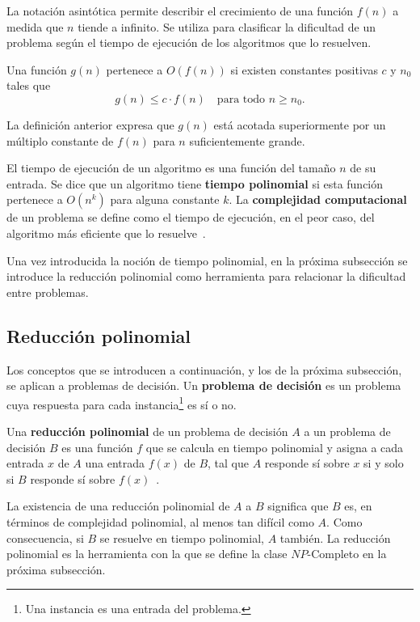 La notación asintótica permite describir el crecimiento de una función
$f(n)$ a medida que $n$ tiende a infinito. Se utiliza para clasificar
la dificultad de un problema según el tiempo de ejecución de los
algoritmos que lo resuelven.

\begin{definicion}
Una función $g(n)$ pertenece a $O(f(n))$ si existen constantes positivas
$c$ y $n_0$ tales que
\[
  g(n) \le c \cdot f(n) \quad \text{para todo } n \ge n_0.
\]
\end{definicion}

La definición anterior expresa que $g(n)$ está acotada superiormente
por un múltiplo constante de $f(n)$ para $n$ suficientemente grande.

El tiempo de ejecución de un algoritmo es una función del tamaño $n$
de su entrada. Se dice que un algoritmo tiene \textbf{tiempo
polinomial} si esta función pertenece a $O(n^k)$ para alguna
constante $k$. La \textbf{complejidad computacional} de un problema
se define como el tiempo de ejecución, en el peor caso, del algoritmo
más eficiente que lo resuelve~\cite{hopcroft2006introduction}.

Una vez introducida la noción de tiempo polinomial, en la próxima
subsección se introduce la reducción polinomial como herramienta para
relacionar la dificultad entre problemas.

\subsection{Reducción polinomial}
\label{sec:reduccion}

Los conceptos que se introducen a continuación, y los de la próxima
subsección, se aplican a problemas de decisión. Un \textbf{problema
de decisión} es un problema cuya respuesta para cada
instancia\footnote{Una instancia es una entrada del problema.} es sí
o no.

\begin{definicion}
Una \textbf{reducción polinomial} de un problema de decisión $A$ a un
problema de decisión $B$ es una función $f$ que se calcula en tiempo
polinomial y asigna a cada entrada $x$ de $A$ una entrada $f(x)$ de
$B$, tal que $A$ responde sí sobre $x$ si y solo si $B$ responde sí
sobre $f(x)$~\cite{hopcroft2006introduction}.
\end{definicion}

La existencia de una reducción polinomial de $A$ a $B$ significa que
$B$ es, en términos de complejidad polinomial, al menos tan difícil
como $A$. Como consecuencia, si $B$ se resuelve en tiempo polinomial,
$A$ también. La reducción polinomial es la herramienta con la que se
define la clase $NP$-Completo en la próxima subsección.

